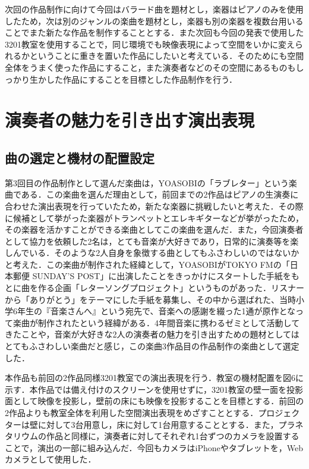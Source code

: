次回の作品制作に向けて今回はバラード曲を題材とし，楽器はピアノのみを使用したため，次は別のジャンルの楽曲を題材とし，楽器も別の楽器を複数台用いることでまた新たな作品を制作することとする．また次回も今回の発表で使用した3201教室を使用することで，同じ環境でも映像表現によって空間をいかに変えられるかということに重きを置いた作品にしたいと考えている．そのためにも空間全体をうまく使った作品にすること，また演奏者などのその空間にあるものもしっかり生かした作品にすることを目標とした作品制作を行う．


\section{演奏者の魅力を引き出す演出表現}
\subsection{曲の選定と機材の配置設定}
第3回目の作品制作として選んだ楽曲は，YOASOBIの「ラブレター」\cite{loveletter}という楽曲である．この楽曲を選んだ理由として，前回までの2作品はピアノの生演奏に合わせた演出表現を行っていたため，新たな楽器に挑戦したいと考えた．その際に候補として挙がった楽器がトランペットとエレキギターなどが挙がったため，その楽器を活かすことができる楽曲としてこの楽曲を選んだ．また，今回演奏者として協力を依頼した2名は，とても音楽が大好きであり，日常的に演奏等を楽しんでいる．そのような2人自身を象徴する曲としてもふさわしいのではないかと考えた．この楽曲が制作された経緯として，YOASOBIがTOKYO FMの「日本郵便 SUNDAY’S POST」に出演したことをきっかけにスタートした手紙をもとに曲を作る企画「レターソングプロジェクト」\cite{lettersong}というものがあった．リスナーから「ありがとう」をテーマにした手紙を募集し、その中から選ばれた、当時小学6年生の『音楽さんへ』という宛先で、音楽への感謝を綴った1通が原作となって楽曲が制作されたという経緯がある．4年間音楽に携わるゼミとして活動してきたことや，音楽が大好きな2人の演奏者の魅力を引き出すための題材としてはとてもふさわしい楽曲だと感じ，この楽曲3作品目の作品制作の楽曲として選定した．

本作品も前回の2作品同様3201教室での演出表現を行う．教室の機材配置を図6に示す．本作品では備え付けのスクリーンを使用せずに，3201教室の壁一面を投影面として映像を投影し，壁前の床にも映像を投影することを目標とする．前回の2作品よりも教室全体を利用した空間演出表現をめざすこととする．プロジェクターは壁に対して3台用意し，床に対して1台用意することとする．また，プラネタリウムの作品と同様に，演奏者に対してそれぞれ1台ずつのカメラを設置することで，演出の一部に組み込んだ．今回もカメラはiPhoneやタブレットを，Webカメラとして使用した．


